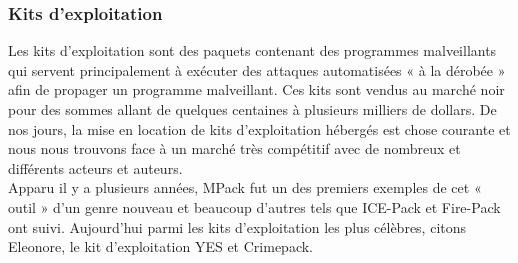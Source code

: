 \subsubsection{Kits d'exploitation}
Les kits d'exploitation sont des paquets contenant des programmes malveillants qui servent principalement à exécuter des attaques automatisées « à la dérobée » afin de propager un programme malveillant. Ces kits sont vendus au marché noir pour des sommes allant de quelques centaines à plusieurs milliers de dollars. De nos jours, la mise en location de kits d'exploitation hébergés est chose courante et nous nous trouvons face à un marché très compétitif avec de nombreux et différents acteurs et auteurs.\\

Apparu il y a plusieurs années, MPack fut un des premiers exemples de cet « outil » d'un genre nouveau et beaucoup d’autres tels que ICE-Pack et Fire-Pack ont suivi. Aujourd’hui parmi les kits d'exploitation les plus célèbres, citons Eleonore, le kit d'exploitation YES et Crimepack.\\

